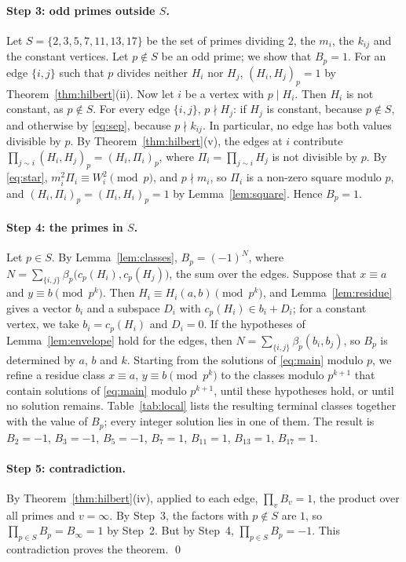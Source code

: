 \documentclass[11pt]{article}
\begin{document}
\paragraph{Step 3: odd primes outside $S$.} Let $S=\{2,3,5,7,11,13,17\}$ be the set of primes dividing $2$, the $m_{i}$, the $k_{ij}$ and the constant vertices. Let $p\notin S$ be an odd prime; we show that $B_p=1$. For an edge $\{i,j\}$ such that $p$ divides neither $H_i$ nor $H_j$, $(H_i,H_j)_p=1$ by Theorem~\ref{thm:hilbert}(ii). Now let $i$ be a vertex with $p\mid H_i$. Then $H_i$ is not constant, as $p\notin S$. For every edge $\{i,j\}$, $p\nmid H_j$: if $H_j$ is constant, because $p\notin S$, and otherwise by \eqref{eq:sep}, because $p\nmid k_{ij}$. In particular, no edge has both values divisible by $p$. By Theorem~\ref{thm:hilbert}(v), the edges at $i$ contribute $\prod_{j\sim i}(H_i,H_j)_p=(H_i,\Pi_i)_p$, where $\Pi_i=\prod_{j\sim i}H_j$ is not divisible by $p$. By \eqref{eq:star}, $m_i^2\Pi_i\equiv W_i^2\pmod p$, and $p\nmid m_i$, so $\Pi_i$ is a non-zero square modulo $p$, and $(H_i,\Pi_i)_p=(\Pi_i,H_i)_p=1$ by Lemma~\ref{lem:square}. Hence $B_p=1$.

\paragraph{Step 4: the primes in $S$.} Let $p\in S$. By Lemma~\ref{lem:classes}, $B_p=(-1)^{N}$, where $N=\sum_{\{i,j\}}\beta_p\bigl(c_p(H_i),c_p(H_j)\bigr)$, the sum over the edges. Suppose that $x\equiv a$ and $y\equiv b\pmod{p^k}$. Then $H_i\equiv H_i(a,b)\pmod{p^k}$, and Lemma~\ref{lem:residue} gives a vector $b_i$ and a subspace $D_i$ with $c_p(H_i)\in b_i+D_i$; for a constant vertex, we take $b_i=c_p(H_i)$ and $D_i=0$. If the hypotheses of Lemma~\ref{lem:envelope} hold for the edges, then $N=\sum_{\{i,j\}}\beta_p(b_i,b_j)$, so $B_p$ is determined by $a$, $b$ and $k$. Starting from the solutions of \eqref{eq:main} modulo $p$, we refine a residue class $x\equiv a$, $y\equiv b\pmod{p^k}$ to the classes modulo $p^{k+1}$ that contain solutions of \eqref{eq:main} modulo $p^{k+1}$, until these hypotheses hold, or until no solution remains. Table~\ref{tab:local} lists the resulting terminal classes together with the value of $B_p$; every integer solution lies in one of them. The result is $B_{2}=-1$, $B_{3}=-1$, $B_{5}=-1$, $B_{7}=1$, $B_{11}=1$, $B_{13}=1$, $B_{17}=1$.

\paragraph{Step 5: contradiction.} By Theorem~\ref{thm:hilbert}(iv), applied to each edge, $\prod_vB_v=1$, the product over all primes and $v=\infty$. By Step~3, the factors with $p\notin S$ are $1$, so $\prod_{p\in S}B_p=B_\infty=1$ by Step~2. But by Step~4, $\prod_{p\in S}B_p=-1$. This contradiction proves the theorem.
\qed
\end{document}
